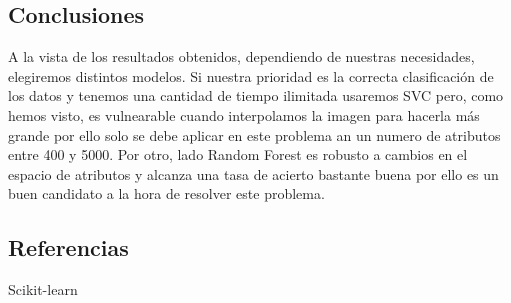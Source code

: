 \documentclass[8pt,a4paper]{article}
\begin{document}
\subsection{Conclusiones}
A la vista de los resultados obtenidos, dependiendo de nuestras necesidades, elegiremos distintos modelos. Si nuestra prioridad es la correcta clasificación de los datos y tenemos
una cantidad de tiempo ilimitada usaremos SVC pero, como hemos visto, es vulnearable cuando interpolamos la imagen para hacerla más grande por ello solo se debe aplicar en este problema an un numero de atributos entre 400 y 5000. Por otro, lado Random Forest es robusto a cambios en el espacio de atributos y alcanza una tasa de acierto bastante buena por ello es un buen candidato a la hora de resolver este problema. 

\subsection{Referencias}
Scikit-learn
\end{document}
